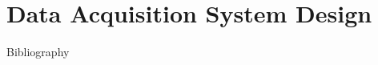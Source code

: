 \documentclass[11pt, twoside, a4paper]{scrreprt}
\begin{document}
    
    \cleardoublepage

    
    \cleardoublepage

  \part{Data Acquisition System Design}

    
    \cleardoublepage

    
    \cleardoublepage

    
    \cleardoublepage

    
    \cleardoublepage


  
  \cleardoublepage

  \listoffigures
  \cleardoublepage

  \listoftables
  \cleardoublepage

  
  \cleardoublepage

  Bibliography
  \printbibliography
  \cleardoublepage
\end{document}
